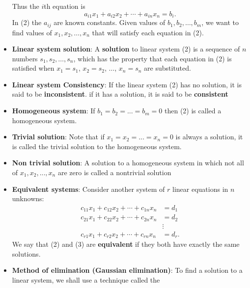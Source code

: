 \documentclass{report}
\begin{document}
\begin{itemize}
\[                \tag{2}
            \]
            \bigbreak \noindent 
            Thus the \(i\)th equation is
            \[
                a_{i1}x_1 + a_{i2}x_2 + \cdots + a_{in}x_n = b_i.
            \]
            \bigbreak \noindent 
            In (2) the \(a_{ij}\) are known constants. Given values of \(b_1, b_2, \ldots, b_m\), we want to find values of \(x_1, x_2, \ldots, x_n\) that will satisfy each equation in (2).
        \item \textbf{Linear system solution}:
            A \textbf{solution} to linear system (2) is a sequence of \(n\) numbers \(s_1, s_2, \ldots, s_n\), which has the property that each equation in (2) is satisfied when \(x_1 = s_1\), \(x_2 = s_2\), \(\ldots\), \(x_n = s_n\) are substituted.
        \item \textbf{Linear system Consistency}: If the linear system (2) has no solution, it is said to be \textbf{inconsistent}. if it has a solution, it is said to be \textbf{consistent}
        \item \textbf{Homogeneous system}: If $b_{1} = b_{2} = ... = b_{m} = 0 $ then (2) is called a homogeneous system.
        \item \textbf{Trivial solution}: Note that if $x_{1} = x_{2} = ... = x_{n} = 0$ is always a solution, it is called the trivial solution to the homogeneous system.
        \item \textbf{Non trivial solution}:  A solution to a homogeneous system in which not all of $x_{1}, x_{2}, ..., x_{n}$ are zero is called a nontrivial solution
        \item \textbf{Equivalent systems}:
            \noindent Consider another system of \(r\) linear equations in \(n\) unknowns:
            \[
                \begin{aligned}
                    c_{11}x_1 + c_{12}x_2 + \cdots + c_{1n}x_n &= d_1 \\
                    c_{21}x_1 + c_{22}x_2 + \cdots + c_{2n}x_n &= d_2 \\
                                                               &\vdots \\
                    c_{r1}x_1 + c_{r2}x_2 + \cdots + c_{rn}x_n &= d_r.
                \end{aligned}
                \tag{3}
            \]
            \noindent We say that (2) and (3) are \textbf{equivalent} if they both have exactly the same solutions.
        \item \textbf{Method of elimination (Gaussian elimination)}:
            To find a solution to a linear system, we shall use a technique called the

\end{itemize}
\end{document}
